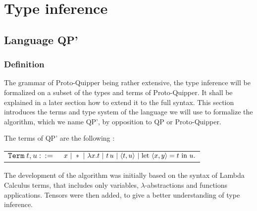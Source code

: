 \section{Type inference}

\subsection{Language QP'}
\subsubsection{Definition}

The grammar of Proto-Quipper being rather extensive, the type inference will be formalized on a subset of the types and terms
of Proto-Quipper. It shall be explained in a later section how to extend it to the full syntax. This section introduces the
terms and type system of the language we will use to formalize the algorithm, which we name QP', by opposition to QP or Proto-Quipper. 

\begin{defn} The terms of QP' are the following :
	\begin{center}
	\begin{tabular}{rl}
		$\texttt{Term} ~t,u~ ::=$ & $x ~|~ * ~|~ \lambda x.t ~|~ t \, u ~|~ \langle t, u \rangle ~|~ \text{let}~ \langle x, y \rangle = t ~\text{in}~ u. $
	\end{tabular}
	\end{center}
	The development of the algorithm was initially based on the syntax of Lambda Calculus terms, that includes only variables,
	$\lambda$-abstractions and functions applications. Tensors were then added, to give a better understanding of type inference.
\end{defn}

